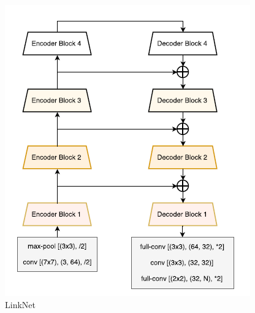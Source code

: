 \begin{frame}[allowframebreaks]
\begin{figure}[h!]
    \centering
    \includegraphics[scale=0.5]{img/section_05/linknet-architecture.png}
    \caption{LinkNet \cite{DBLP:journals/corr/ChaurasiaC17}}
    \label{fig:linknet-architecture}
\end{figure}






\end{frame}
